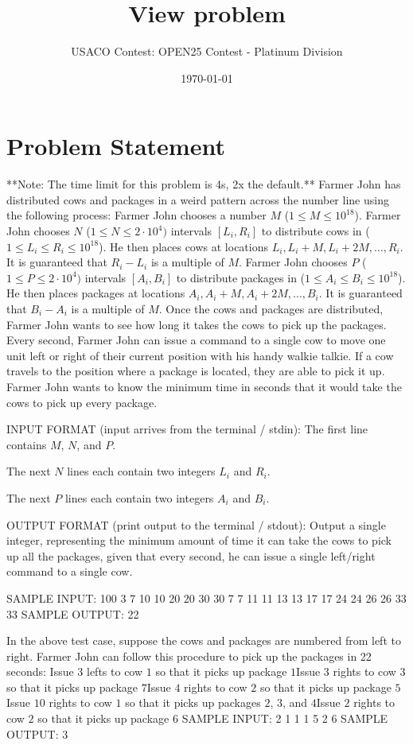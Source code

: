 \documentclass[12pt]{article}
\title{View problem}
\author{USACO Contest: OPEN25 Contest - Platinum Division}
\date{\today}
\begin{document}
\maketitle

\section*{Problem Statement}


**Note: The time limit for this problem is 4s, 2x the default.**
Farmer John has distributed cows and packages in a weird pattern across the
number line using the following process:
 Farmer John chooses a number $M$ ($1 \le M \le 10^{18}$).  Farmer John chooses $N$ ($1 \le N \le 2 \cdot 10^4)$ intervals $[L_i, R_i]$
to distribute cows in ($1 \le L_i \le R_i \le 10^{18}$). He then places cows at
locations $L_i, L_i + M, L_i + 2M, \ldots, R_i$. It is guaranteed that
$R_i - L_i$ is a multiple of $M$.  Farmer John chooses $P$ ($1 \le P \le 2 \cdot 10^4)$ intervals $[A_i, B_i]$
to distribute packages in ($1 \le A_i \le B_i \le 10^{18}$). He then places
packages at locations $A_i, A_i + M, A_i + 2M, \ldots, B_i$. It is guaranteed
that $B_i - A_i$ is a multiple of $M$. 
Once the cows and packages are distributed, Farmer John wants to see how long it
takes the cows to pick up the packages. Every second, Farmer John can issue a
command to a single cow  to move one unit left or right of their current
position with his handy walkie talkie. If a cow travels to the position where a
package is located, they are able to pick it up. Farmer John wants to know the
minimum time in seconds that it would take the cows to pick up every package.

INPUT FORMAT (input arrives from the terminal / stdin):
The first line contains $M$, $N$, and $P$.

The next $N$ lines each contain two integers $L_i$ and $R_i$.

The next $P$ lines each contain two integers $A_i$ and $B_i$.


OUTPUT FORMAT (print output to the terminal / stdout):
Output a single integer, representing the minimum amount of time it can take the
cows to pick up all the packages, given that every second, he can issue a single
left/right command to a single cow.

SAMPLE INPUT:
100 3 7
10 10
20 20
30 30
7 7
11 11
13 13
17 17
24 24
26 26
33 33
SAMPLE OUTPUT: 
22

In the above test case, suppose the cows and packages are numbered from left to
right. Farmer John can follow this procedure to pick up the packages in 22
seconds:
Issue $3$ lefts to cow $1$ so that it picks up package $1$Issue
$3$ rights to cow $3$ so that it picks up package $7$Issue $4$ rights
to cow $2$ so that it picks up package $5$Issue $10$ rights to cow $1$
so that it picks up packages $2$, $3$, and $4$Issue $2$ rights to cow
$2$ so that it picks up package $6$
SAMPLE INPUT:
2 1 1
1 5
2 6
SAMPLE OUTPUT: 
3
\end{document}
